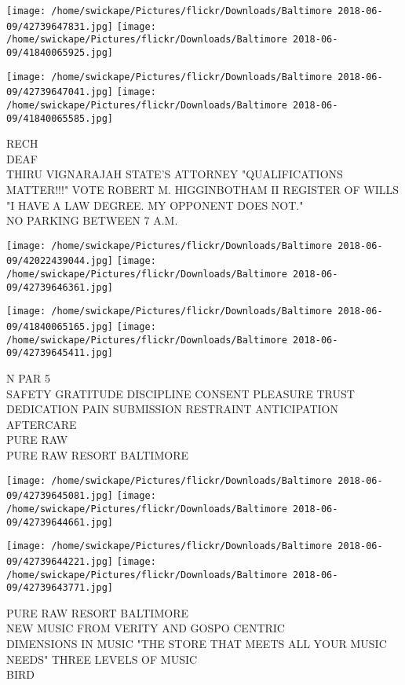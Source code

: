 \documentclass[10pt,letterpaper]{article}
\begin{document}
\texttt{[image: /home/swickape/Pictures/flickr/Downloads/Baltimore 2018-06-09/42739647831.jpg]}
\texttt{[image: /home/swickape/Pictures/flickr/Downloads/Baltimore 2018-06-09/41840065925.jpg]}

\texttt{[image: /home/swickape/Pictures/flickr/Downloads/Baltimore 2018-06-09/42739647041.jpg]}
\texttt{[image: /home/swickape/Pictures/flickr/Downloads/Baltimore 2018-06-09/41840065585.jpg]}

RECH\\
DEAF\\
THIRU VIGNARAJAH STATE'S ATTORNEY "QUALIFICATIONS MATTER!!!" VOTE ROBERT M. HIGGINBOTHAM II REGISTER OF WILLS "I HAVE A LAW DEGREE.  MY OPPONENT DOES NOT."\\
NO PARKING BETWEEN 7 A.M.
\pagebreak

\texttt{[image: /home/swickape/Pictures/flickr/Downloads/Baltimore 2018-06-09/42022439044.jpg]}
\texttt{[image: /home/swickape/Pictures/flickr/Downloads/Baltimore 2018-06-09/42739646361.jpg]}

\texttt{[image: /home/swickape/Pictures/flickr/Downloads/Baltimore 2018-06-09/41840065165.jpg]}
\texttt{[image: /home/swickape/Pictures/flickr/Downloads/Baltimore 2018-06-09/42739645411.jpg]}

N PAR 5\\
SAFETY GRATITUDE DISCIPLINE CONSENT PLEASURE TRUST DEDICATION PAIN SUBMISSION RESTRAINT ANTICIPATION AFTERCARE\\
PURE RAW\\
PURE RAW RESORT BALTIMORE
\pagebreak

\texttt{[image: /home/swickape/Pictures/flickr/Downloads/Baltimore 2018-06-09/42739645081.jpg]}
\texttt{[image: /home/swickape/Pictures/flickr/Downloads/Baltimore 2018-06-09/42739644661.jpg]}

\texttt{[image: /home/swickape/Pictures/flickr/Downloads/Baltimore 2018-06-09/42739644221.jpg]}
\texttt{[image: /home/swickape/Pictures/flickr/Downloads/Baltimore 2018-06-09/42739643771.jpg]}

PURE RAW RESORT BALTIMORE\\
NEW MUSIC FROM VERITY AND GOSPO CENTRIC\\
DIMENSIONS IN MUSIC "THE STORE THAT MEETS ALL YOUR MUSIC NEEDS" THREE LEVELS OF MUSIC\\
BIRD
\pagebreak
\end{document}
